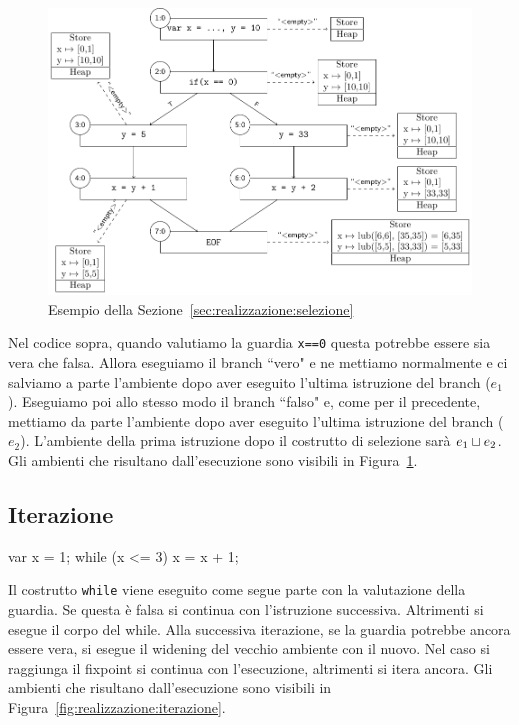 \begin{figure}[htbp]
    \centering
    \includegraphics[width=\textwidth]{scheme-generator/generated/example-if.pdf}
    \caption{Esempio della Sezione~\ref{sec:realizzazione:selezione}}
    \label{fig:realizzazione:selezione}
\end{figure}

Nel codice sopra, quando valutiamo la guardia \texttt{x==0} questa potrebbe essere sia vera che falsa. Allora eseguiamo il branch ``vero" e ne mettiamo normalmente e ci salviamo a parte l'ambiente dopo aver eseguito l'ultima istruzione del branch ($e_1$). Eseguiamo poi allo stesso modo il branch ``falso" e, come per il precedente, mettiamo da parte l'ambiente dopo aver eseguito l'ultima istruzione del branch ($e_2$). L'ambiente della prima istruzione dopo il costrutto di selezione sarà $\join[e_1][e_2]$. 
Gli ambienti che risultano dall'esecuzione sono visibili in Figura~\ref{fig:realizzazione:selezione}.

\subsection{Iterazione}\label{sec:realizzazione:iterazione}
\begin{javascriptcode}
var x = 1;
while (x <= 3) {
    x = x + 1;
}
\end{javascriptcode}
Il costrutto \texttt{while} viene eseguito come segue parte con la valutazione della guardia. Se questa è falsa si continua con l'istruzione successiva. Altrimenti si esegue il corpo del while. Alla successiva iterazione, se la guardia potrebbe ancora essere vera, si esegue il widening del vecchio ambiente con il nuovo. Nel caso si raggiunga il fixpoint si continua con l'esecuzione, altrimenti si itera ancora. Gli ambienti che risultano dall'esecuzione sono visibili in Figura~\ref{fig:realizzazione:iterazione}.

